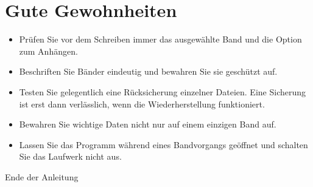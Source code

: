 \documentclass[11pt,a4paper]{article}
\begin{document}
\section{Gute Gewohnheiten}
\begin{itemize}
\item Prüfen Sie vor dem Schreiben immer das ausgewählte Band und die Option zum Anhängen.
\item Beschriften Sie Bänder eindeutig und bewahren Sie sie geschützt auf.
\item Testen Sie gelegentlich eine Rücksicherung einzelner Dateien. Eine Sicherung ist erst dann verlässlich, wenn die Wiederherstellung funktioniert.
\item Bewahren Sie wichtige Daten nicht nur auf einem einzigen Band auf.
\item Lassen Sie das Programm während eines Bandvorgangs geöffnet und schalten Sie das Laufwerk nicht aus.
\end{itemize}

\vfill
\begin{center}\small Ende der Anleitung\end{center}
\end{document}
